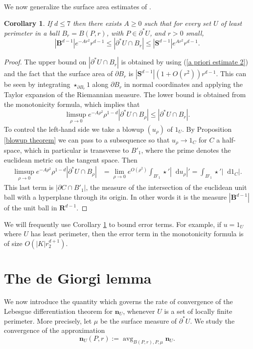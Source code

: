 \documentclass[reqno,11pt]{amsart}
\newcommand{\RR}{\mathbf{R}}
\newcommand{\Sph}{\mathbf S}
\newcommand{\Ball}{\mathbf{B}}
\DeclareMathOperator{\avg}{avg}
\newcommand*\dif{\mathop{}\!\mathrm{d}}
\newcommand{\normal}{\mathbf n}
\newtheorem{corollary}[theorem]{Corollary}
\theoremstyle{definition}
\numberwithin{equation}{section}
\begin{document}
We now generalize the surface area estimates of \cite[Remark 5.13]{Giusti77}.

\begin{corollary}\label{doubling dimension}
If $d \leq 7$ then there exists $A \geq 0$ such that for every set $U$ of least perimeter in a ball $B_r = B(P, r)$, with $P \in \partial^* U$, and $r > 0$ small,
$$|\Ball^{d - 1}|e^{-Ar^2}r^{d - 1} \leq |\partial^*U \cap B_r| \leq |\Sph^{d - 1}|e^{Ar^2} r^{d - 1}.$$
\end{corollary}
\begin{proof}
The upper bound on $|\partial^* U \cap B_r|$ is obtained by using (\ref{a priori estimate 2}) and the fact that the surface area of $\partial B_r$ is $|\Sph^{d - 1}|(1 + O(r^2))r^{d - 1}$.
This can be seen by integrating $\star_{\partial B_r} 1$ along $\partial B_r$ in normal coordinates and applying the Taylor expansion of the Riemannian measure.
The lower bound is obtained from the monotonicity formula, which implies that
$$\limsup_{\rho \to 0} e^{-A\rho^2} \rho^{1 - d} |\partial^* U \cap B_\rho| \leq |\partial^* U \cap B_r|.$$
To control the left-hand side we take a blowup $(u_\rho)$ of $1_U$.
By Proposition \ref{blowup theorem} we can pass to a subsequence so that $u_\rho \to 1_C$ for $C$ a half-space, which in particular is transverse to $B'_1$, where the prime denotes the euclidean metric on the tangent space.
Then
\begin{align*}
\limsup_{\rho \to 0} e^{-A\rho^2} \rho^{1 - d} |\partial^* U \cap B_\rho| &= \lim_{\rho \to 0} e^{O(\rho^2)} \int_{B'_1} \star'|\dif u_\rho|' = \int_{B'_1} \star'|\dif 1_C|.
\end{align*}
This last term is $|\partial C \cap B'_1|$, the measure of the intersection of the euclidean unit ball with a hyperplane through its origin.
In other words it is the measure $|\Ball^{d - 1}|$ of the unit ball in $\RR^{d - 1}$.
\end{proof}

We will frequently use Corollary \ref{doubling dimension} to bound error terms.
For example, if $u = 1_U$ where $U$ has least perimeter, then the error term in the monotonicity formula is of size $O(|K|r_2^{d + 1})$.



\section{The de Giorgi lemma}
We now introduce the quantity which governs the rate of convergence of the Lebesgue differentiation theorem for $\normal_U$, whenever $U$ is a set of locally finite perimeter.
More precisely, let $\mu$ be the surface measure of $\partial^* U$.
We study the convergence of the approximation
$$\normal_U(P, r) := \avg_{B(P, r), P, \mu} \normal_U.$$
\end{document}
